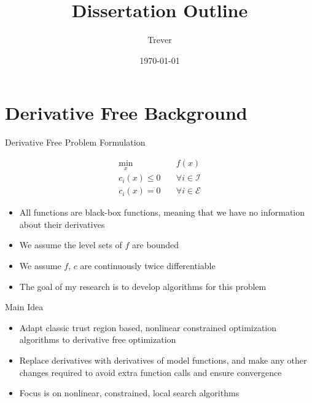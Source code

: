 \documentclass{beamer}
\begin{document}
\title{Dissertation Outline}   
\author{Trever} 
\date{\today} 

\frame{\titlepage} 


\section{Derivative Free Background}

\begin{frame}{Derivative Free Problem Formulation}
\begin{center}
\label{Problem}
\begin{align*}
\min_x & \quad f(x) \\
  c_i(x) \le 0   & \quad \forall i \in \mathcal {I} \\
  c_i(x)  = 0    & \quad \forall i \in \mathcal {E} 
\end{align*}
\end{center}
    \begin{itemize}
        \item All functions are black-box functions, meaning that we have no information about their derivatives
        \item We assume the level sets of $f$ are bounded
        \item We assume $f$, $c$ are continuously twice differentiable
        \item The goal of my research is to develop algorithms for this problem
    \end{itemize}
\end{frame}


\begin{frame}{Main Idea}
    \begin{itemize}
        \item Adapt classic trust region based, nonlinear constrained optimization algorithms to derivative free optimization
        \item Replace derivatives with derivatives of model functions, and make any other changes required to avoid extra function calls and ensure convergence
        \item Focus is on nonlinear, constrained, local search algorithms
    \end{itemize}
\end{frame}
\end{document}
